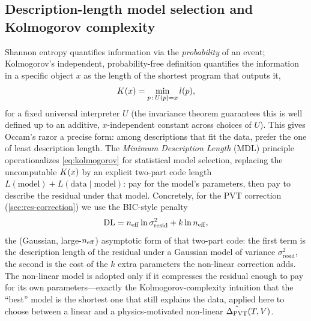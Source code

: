 \subsection{Description-length model selection and Kolmogorov complexity}
\label{sec:th-mdl}
Shannon entropy quantifies information via the \emph{probability} of an event;
Kolmogorov's independent, probability-free definition \cite{kolmogorov1965}
quantifies the information in a specific object $x$ as the length of the
shortest program that outputs it,
\begin{equation}
  K\!\left(x\right) = \min_{p\,:\,U(p)=x} l(p),
  \label{eq:kolmogorov}
\end{equation}
for a fixed universal interpreter $U$ (the invariance theorem guarantees this is
well defined up to an additive, $x$-independent constant across choices of
$U$). This gives Occam's razor a precise form: among descriptions that fit the
data, prefer the one of least description length. The \emph{Minimum Description
Length} (MDL) principle \cite{rissanen1978} operationalizes \cref{eq:kolmogorov} for statistical
model selection, replacing the uncomputable $K\!\left(x\right)$ by an explicit two-part
code length $L(\text{model})+L(\text{data}\mid\text{model})$: pay for the
model's parameters, then pay to describe the residual under that model.
Concretely, for the PVT correction (\cref{sec:res-correction}) we use the
BIC-style penalty
\begin{equation}
  \mathrm{DL} = n_{\mathrm{eff}}\ln\sigma^2_{\text{resid}} + k\ln n_{\mathrm{eff}} ,
  \label{eq:mdl}
\end{equation}
the (Gaussian, large-$n_{\mathrm{eff}}$) asymptotic form of that two-part code: the first
term is the description length of the residual under a Gaussian model of
variance $\sigma^2_{\text{resid}}$, the second is the cost of the $k$ extra
parameters the non-linear correction adds. The non-linear model is adopted only
if it compresses the residual enough to pay for its own parameters---exactly
the Kolmogorov-complexity intuition that the ``best'' model is the shortest one
that still explains the data, applied here to choose between a linear and a
physics-motivated non-linear $\hat{\Delta_{\mathrm{PVT}}}(T,V)$.

